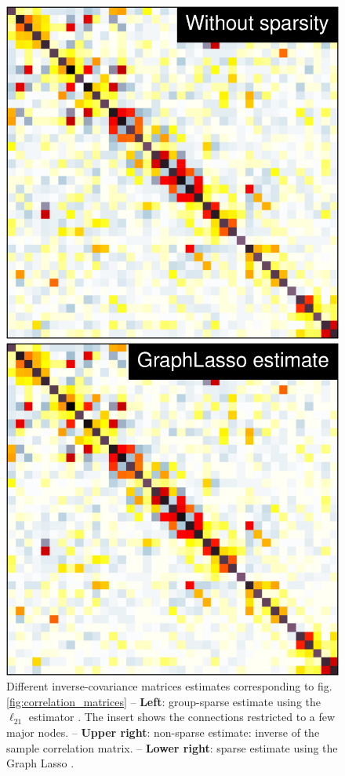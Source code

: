 \documentclass[5p]{elsarticle}
\begin{document}
\begin{figure}
\begin{minipage}{.33\linewidth}
    \includegraphics[width=\linewidth]{group_emp_prec.pdf}%

    \includegraphics[width=\linewidth]{group_l1_prec.pdf}%
\end{minipage}%

\caption{
Different inverse-covariance matrices estimates corresponding to
fig.\,\ref{fig:correlation_matrices} -- \textbf{Left}: group-sparse estimate
using the $\ell_{21}$ estimator \cite{varoquaux2010c}.
The insert shows the
connections restricted to a few major nodes. -- \textbf{Upper
right}: non-sparse estimate: inverse of the sample correlation matrix. --
\textbf{Lower right}: sparse estimate using the Graph Lasso
\cite{friedman2008}.
\label{fig:icov_estimators}
}
\end{figure}
\end{document}
